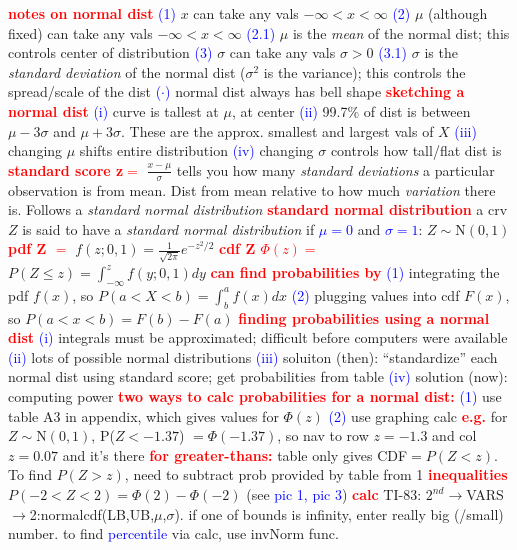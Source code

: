 \documentclass[9pt]{extarticle}
\newcommand{\re}[1]{\textcolor{red}{\textbf{#1}}}
\newcommand{\bt}[1]{\textcolor{blue}{#1}}
\begin{document}
	\re{notes on normal dist}
	\bt{(1)} $x$ can take any vals $-\infty<x<\infty$
	\bt{(2)} $\mu$ (although fixed) can take any vals $-\infty<x<\infty$
	\bt{(2.1)} $\mu$ is the \emph{mean} of the normal dist; this controls center of
	distribution
	\bt{(3)} $\sigma$ can take any vals $\sigma>0$
	\bt{(3.1)} $\sigma$ is the \emph{standard deviation} of the normal dist
	($\sigma^{2}$ is the variance); this controls the spread/scale of the dist
	\bt{($\cdot$)} normal dist always has bell shape
	\re{sketching a normal dist}
	\bt{(i)} curve is tallest at $\mu$, at center
	\bt{(ii)} 99.7$\%$ of dist is between $\mu-3\sigma$ and $\mu+3\sigma$. These are
	the approx. smallest and largest vals of $X$
	\bt{(iii)} changing $\mu$ shifts entire distribution
	\bt{(iv)} changing $\sigma$ controls how tall/flat dist is
	\re{standard score z$=$} $\frac{x-\mu}{\sigma}$ tells you how many \emph{standard
	deviations} a particular observation is from mean. Dist from mean relative to how
	much \emph{variation} there is. Follows a \emph{standard normal distribution}
	\re{standard normal distribution} a crv $Z$ is said to have a \emph{standard
	normal distribution} if \bt{$\mu=0$} and \bt{$\sigma=1$}:
	$Z\mathtt{\sim}$N$(0,1)$
	\re{pdf Z $=$} $f(z;0,1) = \frac{1}{\sqrt{2\pi}}e^{-z^{2}/2}$
	\re{cdf Z $\Phi(z)=$} $P(Z\leq z) = \int_{-\infty}^{z}f(y;0,1)dy$
	\re{can find probabilities by}
	\bt{(1)} integrating the pdf $f(x)$, so $P(a<X<b) = \int_{b}^{a}f(x)dx$
	\bt{(2)} plugging values into cdf $F(x)$, so $P(a<x<b)=F(b)-F(a)$
	\re{finding probabilities using a normal dist}
	\bt{(i)} integrals must be
	approximated; difficult before computers were available
	\bt{(ii)} lots of possible normal distributions
	\bt{(iii)} soluiton (then): ``standardize'' each normal dist using standard score;
	get probabilities from table
	\bt{(iv)} solution (now): computing power
	\re{two ways to calc probabilities for a normal dist:}
	\bt{(1)} use table A3 in appendix, which gives values for $\Phi(z)$
	\bt{(2)} use graphing calc
	\re{e.g.} for $Z\mathtt{\sim}$N$(0,1)$, P($Z < -1.37$) $=\Phi(-1.37)$, so nav to
	row $z=-1.3$ and col $z=0.07$ and it's there
	\re{for greater-thans:} table only gives CDF$=P(Z<z)$. To find $P(Z>z)$, need to
	subtract prob provided by table from 1
	\re{inequalities} $P(-2<Z<2) = \Phi(2) - \Phi(-2)$ (see \bt{pic 1, pic 3})
	\re{calc} TI-83:
	$2^{nd}\rightarrow$VARS$\rightarrow$2:normalcdf(LB,UB,$\mu$,$\sigma$). if one of
	bounds is infinity, enter really big (/small) number. to find \bt{percentile} via
	calc, use invNorm func.
\end{document}
